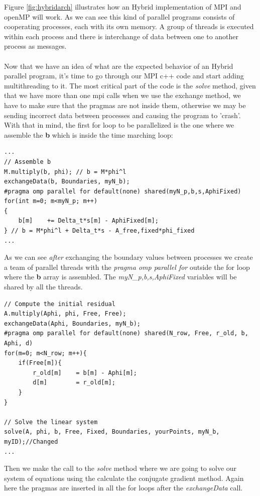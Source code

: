 \documentclass[12pt]{article}
\begin{document}
Figure \ref{fig:hybridarch} illustrates how an Hybrid implementation of MPI and openMP will work. As we can see this kind of parallel programs consists of cooperating processes, each with its own memory. A group of threads is executed within each process and there is interchange of data between one to another process as messages. 
\\\\
Now that we have an idea of what are the expected behavior of an Hybrid parallel program, it's time to go through our MPI c++ code and start adding multithreading to it. The most critical part of the code is the \textit{solve} method, given that we have more than one mpi calls when we use the exchange method, we have to make sure that the pragmas are not inside them, otherwise we may be sending incorrect data between processes and causing the program to 'crash'. With that in mind, the first for loop to be parallelized is the one where we assemble the \textbf{b} which is inside the time marching loop:

\begin{lstlisting}[style=MyC++Style]
...
// Assemble b
M.multiply(b, phi); // b = M*phi^l
exchangeData(b, Boundaries, myN_b);
#pragma omp parallel for default(none) shared(myN_p,b,s,AphiFixed)
for(int m=0; m<myN_p; m++)
{
	b[m]	+= Delta_t*s[m] - AphiFixed[m];
} // b = M*phi^l + Delta_t*s - A_free,fixed*phi_fixed
...
\end{lstlisting}

As we can see \textit{after} exchanging the boundary values between processes we create a team of parallel threads with the \textit{pragma omp parallel for} outside the for loop where the \textbf{b} array is assembled. The \textit{myN_p,b,s,AphiFixed} variables will be shared by all the threads.

\begin{lstlisting}[style=MyC++Style]
// Compute the initial residual
A.multiply(Aphi, phi, Free, Free);
exchangeData(Aphi, Boundaries, myN_b); 
#pragma omp parallel for default(none) shared(N_row, Free, r_old, b, Aphi, d)
for(m=0; m<N_row; m++){
	if(Free[m]){
		r_old[m]	= b[m] - Aphi[m];
		d[m]		= r_old[m];
	}
}

// Solve the linear system
solve(A, phi, b, Free, Fixed, Boundaries, yourPoints, myN_b, myID);//Changed
...
\end{lstlisting}

Then we make the call to the \textit{solve} method where we are going to solve our system of equations using the calculate the conjugate gradient method. Again here the pragmas are inserted in all the for loops after the \textit{exchangeData} call.
 
\end{document}
